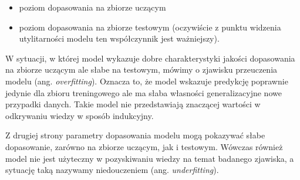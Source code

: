 \documentclass[]{book}
\providecommand{\tightlist}{%
  \setlength{\itemsep}{0pt}\setlength{\parskip}{0pt}}
\theoremstyle{plain}
\theoremstyle{definition}
\theoremstyle{definition}
\theoremstyle{definition}
\theoremstyle{definition}
\theoremstyle{remark}
\begin{document}
\begin{itemize}
\tightlist
\item
  poziom dopasowania na zbiorze uczącym
\item
  poziom dopasowania na zbiorze testowym (oczywiście z punktu widzenia utylitarności modelu ten współczynnik jest ważniejszy).
\end{itemize}

W sytuacji, w której model wykazuje dobre charakterystyki jakości dopasowania na zbiorze uczącym ale słabe na testowym, mówimy o zjawisku przeuczenia modelu (ang. \emph{overfitting}). Oznacza to, że model wskazuje predykcję poprawnie jedynie dla zbioru treningowego ale ma słaba własności generalizacyjne nowe przypadki danych. Takie model nie przedstawiają znaczącej wartości w odkrywaniu wiedzy w sposób indukcyjny.

Z drugiej strony parametry dopasowania modelu mogą pokazywać słabe dopasowanie, zarówno na zbiorze uczącym, jak i testowym. Wówczas również model nie jest użyteczny w pozyskiwaniu wiedzy na temat badanego zjawiska, a sytuację taką nazywamy niedouczeniem (ang. \emph{underfitting}).
\end{document}
